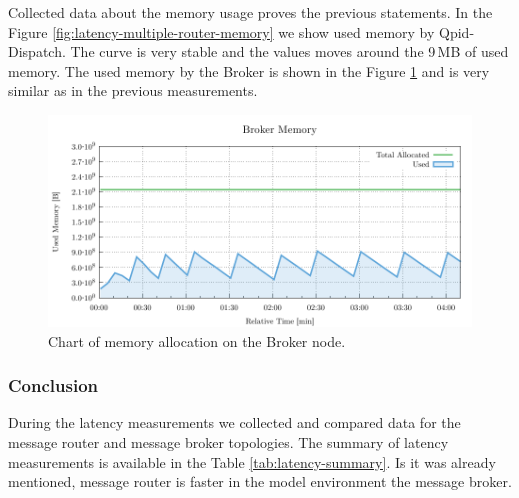 Collected data about the memory usage proves the previous statements. In the Figure \ref{fig:latency-multiple-router-memory} we show used memory by Qpid-Dispatch. The curve is very stable and the values moves around the 9\,MB of used memory. The used memory by the Broker is shown in the Figure \ref{fig:latency-multiple-broker-memory} and is very similar as in the previous measurements.

\begin{figure}[H]
	\centering
	\includegraphics[width=1\linewidth]{obrazky-figures/charts/multipoint-router-broker-latency-memory.pdf}
	\caption{Chart of memory allocation on the Broker node.}
	\label{fig:latency-multiple-broker-memory}
\end{figure}

\subsubsection*{Conclusion}
\enlargethispage{2em}
During the latency measurements we collected and compared data for the message router and message broker topologies. The summary of latency measurements is available in the Table \ref{tab:latency-summary}. Is it was already mentioned, message router is faster in the model environment the message broker.

